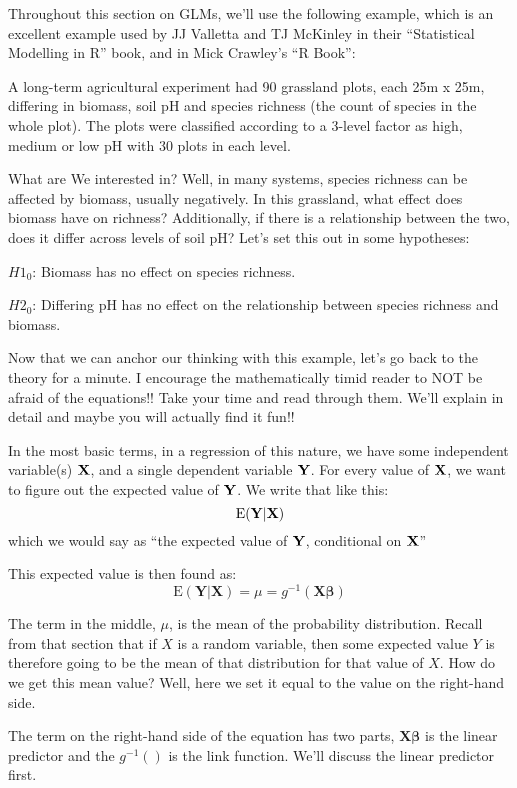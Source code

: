 \documentclass[
]{article}
\begin{document}
Throughout this section on GLMs, we'll use the following example, which
is an excellent example used by JJ Valletta and TJ McKinley in their
``Statistical Modelling in R'' book, and in Mick Crawley's ``R Book'':

A long-term agricultural experiment had 90 grassland plots, each 25m x
25m, differing in biomass, soil pH and species richness (the count of
species in the whole plot). The plots were classified according to a
3-level factor as high, medium or low pH with 30 plots in each level.

What are We interested in? Well, in many systems, species richness can
be affected by biomass, usually negatively. In this grassland, what
effect does biomass have on richness? Additionally, if there is a
relationship between the two, does it differ across levels of soil pH?
Let's set this out in some hypotheses:

\(H1_0\): Biomass has no effect on species richness.

\(H2_0\): Differing pH has no effect on the relationship between species
richness and biomass.

Now that we can anchor our thinking with this example, let's go back to
the theory for a minute. I encourage the mathematically timid reader to
NOT be afraid of the equations!! Take your time and read through them.
We'll explain in detail and maybe you will actually find it fun!!

In the most basic terms, in a regression of this nature, we have some
independent variable(s) \(\bf{X}\), and a single dependent variable
\(\bf{Y}\). For every value of \(\bf{X}\), we want to figure out the
expected value of \(\bf{Y}\). We write that like this:
\[\text{E(}\bf{Y}|\bf{X})\] which we would say as ``the expected value
of \(\bf{Y}\), conditional on \(\bf{X}\)''

This expected value is then found as:
\[\text{E}(\textbf{Y}|\textbf{X}) = \mu =g^{-1}(\textbf{X}\boldsymbol{\beta})\]

The term in the middle, \(\mu\), is the mean of the probability
distribution. Recall from that section that if \(X\) is a random
variable, then some expected value \(Y\) is therefore going to be the
mean of that distribution for that value of \(X\). How do we get this
mean value? Well, here we set it equal to the value on the right-hand
side.

The term on the right-hand side of the equation has two parts,
\(\textbf{X}\boldsymbol{\beta}\) is the linear predictor and the
\(g^{-1}()\) is the link function. We'll discuss the linear predictor
first.
\end{document}
